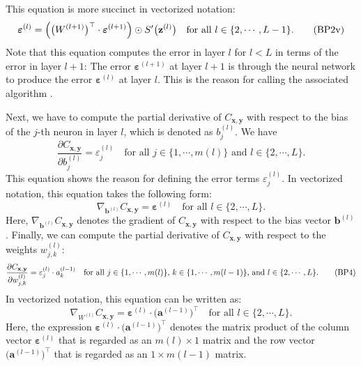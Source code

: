 This equation is more succinct in vectorized notation:
\begin{equation}
  \label{eq:BP2v}
  \boldsymbol{\varepsilon}^{(l)} = \Bigl(\bigl(W^{(l+1)}\bigr)^\top \cdot \boldsymbol{\varepsilon}^{(l+1)}\Bigr) \odot
  S'\bigl(\mathbf{z}^{(l)}\bigr) \quad \mbox{for all $l \in \{2, \cdots, L-1\}$}.
  \tag{BP2v}
\end{equation}
Note that this equation computes the error in layer $l$ for $l < L$ in terms
of the error in layer $l+1$:  The error 
$\boldsymbol{\varepsilon}^{(l+1)}$ at layer $l+1$ is  through the neural network to produce the
error $\boldsymbol{\varepsilon}^{(l)}$ at layer $l$.  This is the reason for calling the associated algorithm .

Next, we have to compute the partial derivative of $C_{\mathbf{x}, \mathbf{y}}$ with respect to the bias of the
$j$-th neuron in layer $l$, which is denoted as $b_j^{(l)}$.  We have
\begin{equation}
  \label{eq:BP3}
  \frac{\partial C_{\mathbf{x}, \mathbf{y}}}{\partial b_j^{(l)}} = \varepsilon_j^{(l)}
  \quad \mbox{for all $j \in \{1,\cdots,m(l)\}$ and $l \in \{2, \cdots,L\}$.}
  \tag{BP3}
\end{equation}
This equation shows the reason for defining the error terms $\varepsilon_j^{(l)}$.
In vectorized notation, this equation takes the following form:
\begin{equation}
  \label{eq:BP3v}
  \nabla_{\mathbf{b}^{(l)}} C_{\mathbf{x}, \mathbf{y}} = \boldsymbol{\varepsilon}^{(l)}
  \quad \mbox{for all $l \in \{2, \cdots,L\}$.}
  \tag{BP3v}
\end{equation}
Here, $\nabla_{\mathbf{b}^{(l)}} C_{\mathbf{x}, \mathbf{y}}$ denotes the gradient of $C_{\mathbf{x},
  \mathbf{y}}$ with respect to the bias vector $\mathbf{b}^{(l)}$.
Finally, we can compute the  partial derivative of $C_{\mathbf{x}, \mathbf{y}}$ with respect to the weights $w_{j,k}^{(l)}$:
\begin{equation}
  \label{eq:BP4}
  \frac{\partial C_{\mathbf{x}, \mathbf{y}}}{\partial w_{j,k}^{(l)}} = \varepsilon_j^{(l)} \cdot a_k^{(l-1)} 
  \quad \mbox{for all $j \in \{1,\cdots,m(l)\}$, $ k \in \{1,\cdots,m(l-1)\}$, and $l \in \{2, \cdots,L\}$.}
  \tag{BP4}
\end{equation}
In vectorized notation, this equation can be written as:
\begin{equation}
  \label{eq:BP4v}
  \nabla_{W^{(l)}} C_{\mathbf{x}, \mathbf{y}} = \boldsymbol{\varepsilon}^{(l)} \cdot \bigl(\mathbf{a}^{(l-1)}\bigr)^\top
  \quad \mbox{for all $l \in \{2, \cdots,L\}$.}
  \tag{BP4v}
\end{equation}
Here, the expression $\boldsymbol{\varepsilon}^{(l)} \cdot \bigl(\mathbf{a}^{(l-1)}\bigr)^\top$ denotes the matrix
product of the column vector $\boldsymbol{\varepsilon}^{(l)}$ that is regarded as an $m(l) \times 1$ matrix and the
row vector $\bigl(\mathbf{a}^{(l-1)}\bigr)^\top$ that is regarded as an $1 \times m(l-1)$ matrix.

